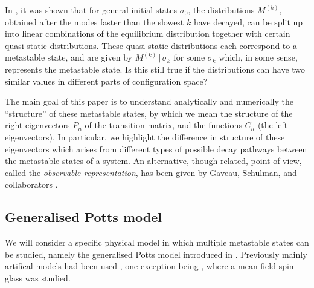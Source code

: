 \documentclass[10pt]{article}
\newcommand{\given}{\, | \,}
\newcommand{\M}[1]{M^{(#1)}}
\newcommand{\comment}[1]{{\color{red}#1}}
\begin{document}
In \cite{LarraldeLeyvrazSandersJStatMech2006}, it was shown that for general initial states
$\sigma_0$, the distributions $\M{k}$, obtained after the modes faster than the slowest $k$ have decayed,
can be split up into linear combinations
of the equilibrium distribution together with certain quasi-static distributions.
These quasi-static distributions each correspond to
a metastable state, and are given by $\M{k} \given \sigma_k$ for
some $\sigma_k$ which, in some sense, represents the metastable state. \comment{Is this still true if the distributions
can have two similar values in different parts of configuration space?}

The main goal of this paper is to understand analytically and numerically the
``structure'' of these metastable states, by which we mean the structure of the
right eigenvectors $P_n$ of the transition matrix, and the functions $C_n$ (the left eigenvectors).
In particular, we highlight the difference in structure of these eigenvectors which arises from different types of possible decay pathways between the metastable states of a system.
An alternative, though related, point of view, called the \emph{observable representation}, has been given by Gaveau, Schulman, and collaborators \cite{GaveauSchulmanMultiplePhasesPRE2006,
GaveauSchulmanImagingGeomThroughDynObsRepnJPA2006}. 


% 
% 



\subsection{Generalised Potts model}

We will consider a specific physical model in which multiple metastable states
can be studied, namely the generalised Potts model introduced in
\cite{SandersLarraldeLeyvrazCompetitiveNucleationPottsPRB2007}. Previously
mainly artifical models had been used
\cite{GaveauSchulmanMultiplePhasesPRE2006}, one exception being
\cite{SchulmanMeanFieldSpinGlassObsRepnPRL2007}, where a mean-field spin glass
was studied.
\end{document}
